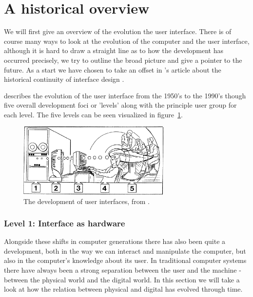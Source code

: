 \section{A historical overview}
We will first give an overview of the evolution the user interface.
There is of course many ways to look at the evolution of the computer and the user interface, although it is hard to draw a straight line as to how the development has occurred precisely, we try to outline the broad picture and give a pointer to the future.
As a start we have chosen to take an offset in \citeauthor{grudin1990computer}'s article about the historical continuity of interface design \citep{grudin1990computer}.

\citeauthor{grudin1990computer} describes the evolution of the user interface from the 1950's to the 1990's though five overall development foci or 'levels' along with the principle user group for each level.
The five levels can be seen visualized in figure~\ref{foci-interface}.

\begin{figure}[hb]
	\centering
  		\includegraphics[width=3in]{figures/foci-interface}
	\caption[The development of user interfaces \citep{grudin1990computer}.]
   {The development of user interfaces, from \citep{grudin1990computer}.}
   \label{foci-interface}
\end{figure}

\subsubsection{Level 1: Interface as hardware}


Alongside these shifts in computer generations there has also been quite a development, both in the way we can interact and manipulate the computer, but also in the computer's knowledge about its user.
In traditional computer systems there have always been a strong separation between the user and the machine - between the physical world and the digital world.
In this section we will take a look at how the relation between physical and digital has evolved through time.

